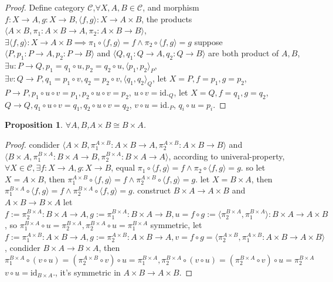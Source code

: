 \documentclass[10pt,a4paper]{article}
\newtheorem{proposition}[theorem]{Proposition}
\begin{document}
\begin{proof}
    Define category $\mathcal{C}$,$\forall X,A,B\in\mathcal{C}$, and morphism $f:X\to A,g:X\to B,\langle f,g\rangle:X\to A\times B$, 
    the products 
    $\langle A\times B,
    \pi_1:A\times B\to A,
    \pi_2:A\times B\to B\rangle$, 
    $\exists\langle f,g\rangle:X\to A\times B\implies\pi_1\circ\langle f,g\rangle=f\land\pi_2\circ\langle f,g\rangle=g$
    suppose $\langle P,p_1:P\to A,p_2:P\to B\rangle$ and 
    $\langle Q,q_1:Q\to A,q_2:Q\to B\rangle$ are both product of $A,B$,
    $\exists u:P\to Q,p_1=q_1\circ u,p_2=q_2\circ u,\langle p_1,p_2\rangle_{P}$,
    $\exists v:Q\to P,q_1=p_1\circ v,q_2=p_2\circ v,\langle q_1,q_2\rangle_{Q}$,
    let $X=P,f=p_1,g=p_2$,
    $P\to P,p_1\circ u\circ v=p_1,p_2\circ u\circ v=p_2$,
    $u\circ v=\mathrm{id.}_Q$,
    let $X=Q,f=q_1,g=q_2$,
    $Q\to Q,q_1\circ u\circ v=q_1,q_2\circ u\circ v=q_2$,
    $v\circ u=\mathrm{id.}_P$,
    $q_i\circ u=p_i$.
\end{proof}
\begin{proposition}
    $\forall A,B$,$A\times B\cong B\times A$.
\end{proposition}
\begin{proof}
    condider $\langle A\times B,\pi_1^{A\times B}:A\times B\to A,\pi_2^{A\times B}:A\times B\to B\rangle$ and
    $\langle B\times A,\pi_1^{B\times A}:B\times A\to B,\pi_2^{B\times A}:B\times A\to A\rangle$, according to univeral-property,
    $\forall X\in\mathcal C,\exists f:X\to A,g:X\to B$, equal $\pi_1\circ\langle f,g\rangle=f\land\pi_2\circ\langle f,g\rangle=g$.
    so let $X=A\times B$, then $\pi_1^{A\times B}\circ\langle f,g\rangle=f\land\pi_2^{A\times B}\circ\langle f,g\rangle=g$.
    let $X=B\times A$, then $\pi_1^{B\times A}\circ\langle f,g\rangle=f\land\pi_2^{B\times A}\circ\langle f,g\rangle=g$.
    construct $B\times A\to A\times B$ and $A\times B\to B\times A$
    let $f:=\pi_2^{B\times A}:B\times A\to A,g:=\pi_1^{B\times A}:B\times A\to B,u=f\circ g:=\langle\pi_2^{B\times A},\pi_1^{B\times A}\rangle:B\times A\to A\times B$,
    so $\pi_1^{B\times A}\circ u=\pi_2^{B\times A},\pi_2^{B\times A}\circ u=\pi_1^{B\times A}$
    symmetric, let $f:=\pi_1^{A\times B}:A\times B\to A,g:=\pi_2^{A\times B}:A\times B\to A,v=f\circ g=\langle\pi_2^{A\times B},\pi_1^{A\times B}:A\times B\to A\times B\rangle$,
    condider $B\times A\to B\times A$, then $\pi_1^{B\times A}\circ(v\circ u)=(\pi_2^{A\times B}\circ v)\circ u=\pi_1^{B\times A},\pi_2^{B\times A}\circ(v\circ u)=(\pi_2^{B\times A}\circ v)\circ u=\pi_2^{B\times A}$
    $v\circ u=\mathrm{id}_{B\times A}.$, it's symmetric in $A\times B\to A\times B$.
\end{proof}
\end{document}
